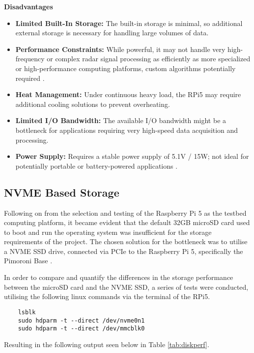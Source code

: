 \noindent \textbf{Disadvantages} 
\begin{itemize}
    \item \textbf{Limited Built-In Storage:} The built-in storage is minimal, so additional external storage is necessary for handling large volumes of data.
    \item \textbf{Performance Constraints:} While powerful, it may not handle very high-frequency or complex radar signal processing as efficiently as more specialized or high-performance computing platforms, custom algorithms potentially required \cite{IOTpassiveRadar}.
    \item \textbf{Heat Management:} Under continuous heavy load, the RPi5 may require additional cooling solutions to prevent overheating.
    \item \textbf{Limited I/O Bandwidth:} The available I/O bandwidth might be a bottleneck for applications requiring very high-speed data acquisition and processing.
    \item \textbf{Power Supply:} Requires a stable power supply of 5.1V / 15W; not ideal for potentially portable or battery-powered applications \cite{rpi5_wifi}. 
\end{itemize}



\subsection{NVME Based Storage \label{sec:storage}}
Following on from the selection and testing of the Raspberry Pi 5 as the testbed computing platform, it became evident that the default 32GB microSD card used to boot and run the operating system was insufficient for the storage requirements of the project. The chosen solution for the bottleneck was to utilise a NVME SSD drive, connected via PCIe to the Raspberry Pi 5, specifically the Pimoroni Base \cite{pimoroni_nvme_base}.

In order to compare and quantify the differences in the storage performance between the microSD card and the NVME SSD, a series of tests were conducted, utilising the following linux commands via the terminal of the RPi5.

\begin{verbatim}
    lsblk
    sudo hdparm -t --direct /dev/nvme0n1 
    sudo hdparm -t --direct /dev/mmcblk0
\end{verbatim}

\noindent Resulting in the following output seen below in Table \ref{tab:diskperf}.

